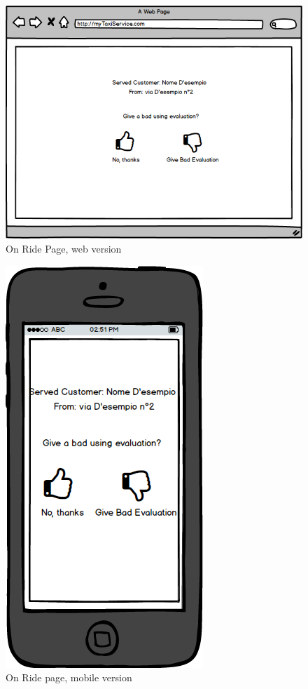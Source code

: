 				\begin{figure}[H]
					\centering
					\includegraphics[scale=0.5]{IMG/UserInterfaces/onRidePage.png}
					\caption{On Ride Page, web version}\label{tendRidePage_w}
				\end{figure}
				\begin{figure}[H]
					\centering
					\includegraphics[scale=0.4]{IMG/UserInterfaces/onRidePage_m.png}
					\caption{On Ride page, mobile version}\label{tendRidePage_m}
				\end{figure}
				

